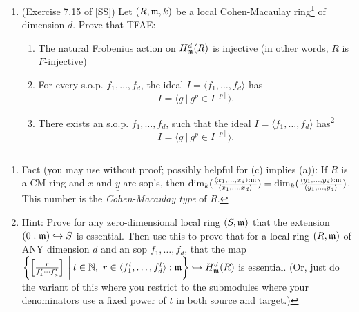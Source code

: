 \documentclass[11pt]{amsart}
\begin{document}
\begin{enumerate}[itemsep=1.5em]
\begin{enumerate}
\item Prove that the kernel of the natural Frobenius action on $H^d_{\mf m}(R)$ is a proper submodule of $H^d_{\mf m}(R)$.
\end{enumerate}


\item (Exercise 7.15 of [SS]) Let $(R,\mathfrak{m}, k)$ be a local Cohen-Macaulay ring\footnote{Fact (you may use without proof; possibly helpful for (c) implies (a)): If $R$ is a CM ring and $\underline x$ and $\underline y$ are sop's, then $\dim_k(\frac{\langle x_1,\ldots, x_d\rangle:\mathfrak{m}}{\langle x_1,\ldots, x_d\rangle}) =\dim_k(\frac{\langle y_1,\ldots, y_d\rangle:\mathfrak{m}}{\langle y_1,\ldots, y_d\rangle})$. This number is the \emph{Cohen-Macaulay type} of $R$.} of dimension $d$. Prove that TFAE:
\begin{enumerate}
\item The natural Frobenius action on $H^d_{\mf m}(R)$ is injective (in other words, $R$ is $F$-injective)
\item For every s.o.p. $f_1,\ldots, f_d$, the ideal $I=\langle f_1,\ldots, f_d\rangle $ has
\[
I = \langle g \: | \: g^p \in I^{[p]}\rangle.
\]
\item There exists an s.o.p. $f_1,\ldots, f_d$, such that the ideal $I=\langle f_1,\ldots, f_d\rangle $ has\footnote{Hint: Prove for any zero-dimensional local ring $(S,\mathfrak{m})$ that the extension $(0:\mathfrak{m})\hookrightarrow S$ is essential. Then use this to prove that for a local ring $(R,\mathfrak{m})$ of ANY dimension $d$ and an sop $f_1,\ldots, f_d$, that the map
\(
\left\{ \left[\frac{r}{f_1^t\cdots f_d^t}\right]\: \bigg| \: t\in \mathbb{N},\ r\in \langle f_1^t,\ldots, f_d^t\rangle:\mathfrak{m}    \right\}
    \hookrightarrow 
H^d_{\mathfrak{m}}(R)
\)
is essential. (Or, just do the variant of this where you restrict to the submodules where your denominators use a  fixed power of $t$ in both source and target.)}
\[
I = \langle g \: | \: g^p \in I^{[p]}\rangle.
\]
\end{enumerate}

\end{enumerate}
\end{document}
